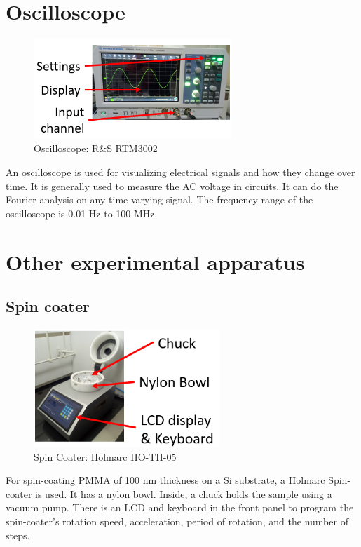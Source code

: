\documentclass[12pt,a4paper,bold]{thesis}
\theoremstyle{thm}
\theoremstyle{definition}
\begin{document}
\section{Oscilloscope}
\begin{figure}[H]
	\centering
   \includegraphics[width=7.5cm]{Images/17.png} 
   \caption{Oscilloscope: R\&S RTM3002}
\end{figure}
\indent\indent\indent An oscilloscope is used for visualizing electrical signals and how they change over time. It is generally used to measure the AC voltage in circuits. It can do the Fourier analysis on any time-varying signal. The frequency range of the oscilloscope is 0.01 Hz to 100 MHz.
\section{Other experimental apparatus}
\subsection{Spin coater}
\begin{figure}[H]
	\centering
   \includegraphics[width=7cm]{Images/4.png} 
   \caption{Spin Coater: Holmarc HO-TH-05}
\end{figure}
\indent\indent\indent For spin-coating PMMA of 100 nm thickness on a Si substrate, a Holmarc Spin-coater is used. It has a nylon bowl. Inside, a chuck holds the sample using a vacuum pump. There is an LCD and keyboard in the front panel to program the spin-coater's rotation speed, acceleration, period of rotation, and the number of steps.
\end{document}
